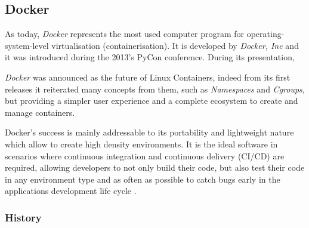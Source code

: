 \documentclass[a4paper,12pt]{article}
\begin{document}
\subsection{Docker}

As today, \textit{Docker} represents the most used computer program for
operating-system-level virtualisation (containerisation). It is developed by
\textit{Docker, Inc}\cite{docker_official_site} and it was introduced during the
2013's PyCon conference. During its presentation, \par\textit{Docker} was
announced as the future of Linux Containers\cite{docker_pycon_presentation},
indeed from its first releases it reiterated many concepts from them, such as
\textit{Namespaces} and \textit{Cgroups}, but providing a simpler user
experience and a complete ecosystem to create and manage containers.\par
Docker's success is mainly addressable to its portability and lightweight
nature which allow to create high density environments. It is the ideal software
in scenarios where continuous integration and continuous delivery (CI/CD) are
required, allowing developers to not only build their code, but also test their
code in any environment type and as often as possible to catch bugs early in the
applications development life cycle \cite{docker_ci_cd}. 

\subsubsection{History}
\end{document}
